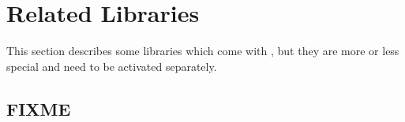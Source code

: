 \chapter{Related Libraries}
This section describes some libraries which come with \PGFPlots, but they are more or less special and need to be activated separately.

% 






\section{FIXME} \endinput








